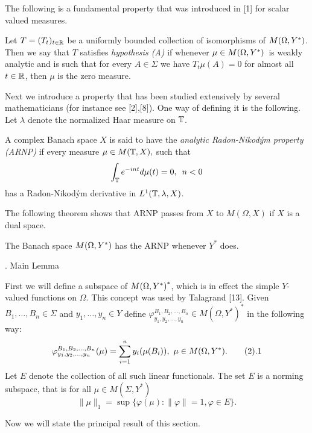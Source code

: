 The following is a fundamental property
that was introduced in [1] for
scalar valued measures.

   Let
$T = (T_t)_{t\in \Bbb R}$  be a uniformly bounded
collection of isomorphisms of $M(\Omega, Y^*)$.
Then we say that $T$ satisfies {\it hypothesis (A)\/} if
whenever  $\mu\in M(\Omega, Y^*) \,$ is  weakly analytic and is such that
for every $A\in \Sigma$ we have
$T_t \mu (A)=0$ for almost  all $t\in \Bbb R$,
then $\mu$ is the zero measure. \enddefinition

 Next we introduce a property that has been studied extensively by
several
mathematicians (for instance see [2],[8]). One way of defining it is the
following.
 Let $\lambda$ denote the normalized Haar measure on $\Bbb T$.

   A complex Banach space $X$ is said
to have
the {\it analytic Radon-Nikod\'ym property (ARNP)\/}
if  every  measure $\mu \in M(\Bbb T, X), $  such that
$$\int_{\Bbb T} e^{-int} d\mu (t) =0,\,\,\, n<0$$
has a Radon-Nikod\'ym derivative in $L^1 (\Bbb T, \lambda, X)$.
\enddefinition

   The following theorem shows that ARNP passes from $X$ to
$M(\Omega ,X)$
if $X$ is a dual space.

 The Banach space  $M(\Omega, Y^*)$ has the ARNP
whenever
$Y^*$ does.\endproclaim



. Main Lemma
\endspecialhead

First we will define a subspace of ${M(\Omega, Y^*)}^*$, which
is in effect the simple $Y$-valued functions on $\Omega$.  This concept
was used by Talagrand [13].
Given  $B_1, \dots,B_n \in \Sigma$ and
$y_1,\dots, y_n \in Y $ define $\varphi_{y_1,
y_2,\dots,y_n}^{B_1,B_2,\dots,B_n}
\in M(\Omega,Y^*)^*$ in the following way:
 $$\varphi_{y_1, y_2,\dots,y_n}^{B_1,B_2,\dots,B_n}(\mu)=\sum_{i=1}^n
y_i(\mu(B_i)), \,\,\mu \in M(\Omega,Y^*)  .\tag2.1$$
Let $E$ denote the collection of all such linear functionals.
The set $E$ is a norming subspace, that is for all $\mu\in
M(\Sigma, Y^*)$
$$\| \mu \|_1 = \sup\{ \varphi(\mu):\| \varphi \| =1, \varphi\in E\}.$$


Now we will state the principal result of this section.


